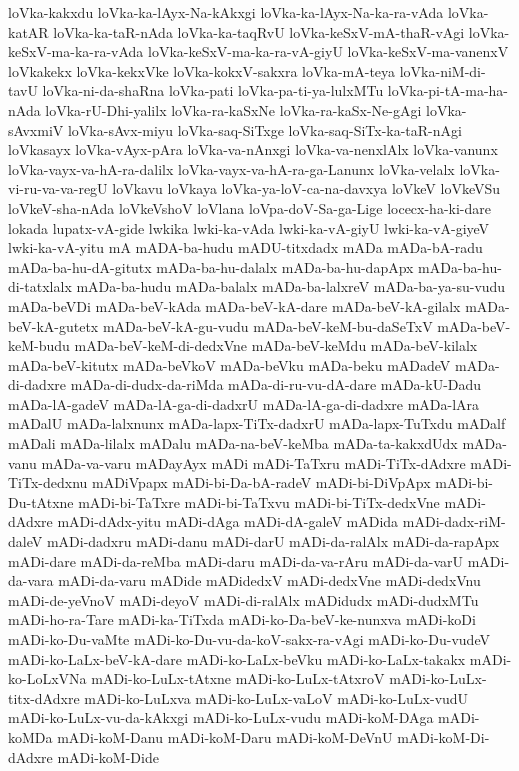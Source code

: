{loVka-kakxdu
loVka-ka-lAyx-Na-kAkxgi
loVka-ka-lAyx-Na-ka-ra-vAda
loVka-katAR
loVka-ka-taR-nAda
loVka-ka-taqRvU
loVka-keSxV-mA-thaR-vAgi
loVka-keSxV-ma-ka-ra-vAda
loVka-keSxV-ma-ka-ra-vA-giyU
loVka-keSxV-ma-vanenxV
loVkakekx
loVka-kekxVke
loVka-kokxV-sakxra
loVka-mA-teya
loVka-niM-di-tavU
loVka-ni-da-shaRna
loVka-pati
loVka-pa-ti-ya-lulxMTu
loVka-pi-tA-ma-ha-nAda
loVka-rU-Dhi-yalilx
loVka-ra-kaSxNe
loVka-ra-kaSx-Ne-gAgi
loVka-sAvxmiV
loVka-sAvx-miyu
loVka-saq-SiTxge
loVka-saq-SiTx-ka-taR-nAgi
loVkasayx
loVka-vAyx-pAra
loVka-va-nAnxgi
loVka-va-nenxlAlx
loVka-vanunx
loVka-vayx-va-hA-ra-dalilx
loVka-vayx-va-hA-ra-ga-Lanunx
loVka-velalx
loVka-vi-ru-va-va-regU
loVkavu
loVkaya
loVka-ya-loV-ca-na-davxya
loVkeV
loVkeVSu
loVkeV-sha-nAda
loVkeVshoV
loVlana
loVpa-doV-Sa-ga-Lige
locecx-ha-ki-dare
lokada
lupatx-vA-gide
lwkika
lwki-ka-vAda
lwki-ka-vA-giyU
lwki-ka-vA-giyeV
lwki-ka-vA-yitu
mA
mADA-ba-hudu
mADU-titxdadx
mADa
mADa-bA-radu
mADa-ba-hu-dA-gitutx
mADa-ba-hu-dalalx
mADa-ba-hu-dapApx
mADa-ba-hu-di-tatxlalx
mADa-ba-hudu
mADa-balalx
mADa-ba-lalxreV
mADa-ba-ya-su-vudu
mADa-beVDi
mADa-beV-kAda
mADa-beV-kA-dare
mADa-beV-kA-gilalx
mADa-beV-kA-gutetx
mADa-beV-kA-gu-vudu
mADa-beV-keM-bu-daSeTxV
mADa-beV-keM-budu
mADa-beV-keM-di-dedxVne
mADa-beV-keMdu
mADa-beV-kilalx
mADa-beV-kitutx
mADa-beVkoV
mADa-beVku
mADa-beku
mADadeV
mADa-di-dadxre
mADa-di-dudx-da-riMda
mADa-di-ru-vu-dA-dare
mADa-kU-Dadu
mADa-lA-gadeV
mADa-lA-ga-di-dadxrU
mADa-lA-ga-di-dadxre
mADa-lAra
mADalU
mADa-lalxnunx
mADa-lapx-TiTx-dadxrU
mADa-lapx-TuTxdu
mADalf
mADali
mADa-lilalx
mADalu
mADa-na-beV-keMba
mADa-ta-kakxdUdx
mADa-vanu
mADa-va-varu
mADayAyx
mADi
mADi-TaTxru
mADi-TiTx-dAdxre
mADi-TiTx-dedxnu
mADiVpapx
mADi-bi-Da-bA-radeV
mADi-bi-DiVpApx
mADi-bi-Du-tAtxne
mADi-bi-TaTxre
mADi-bi-TaTxvu
mADi-bi-TiTx-dedxVne
mADi-dAdxre
mADi-dAdx-yitu
mADi-dAga
mADi-dA-galeV
mADida
mADi-dadx-riM-daleV
mADi-dadxru
mADi-danu
mADi-darU
mADi-da-ralAlx
mADi-da-rapApx
mADi-dare
mADi-da-reMba
mADi-daru
mADi-da-va-rAru
mADi-da-varU
mADi-da-vara
mADi-da-varu
mADide
mADidedxV
mADi-dedxVne
mADi-dedxVnu
mADi-de-yeVnoV
mADi-deyoV
mADi-di-ralAlx
mADidudx
mADi-dudxMTu
mADi-ho-ra-Tare
mADi-ka-TiTxda
mADi-ko-Da-beV-ke-nunxva
mADi-koDi
mADi-ko-Du-vaMte
mADi-ko-Du-vu-da-koV-sakx-ra-vAgi
mADi-ko-Du-vudeV
mADi-ko-LaLx-beV-kA-dare
mADi-ko-LaLx-beVku
mADi-ko-LaLx-takakx
mADi-ko-LoLxVNa
mADi-ko-LuLx-tAtxne
mADi-ko-LuLx-tAtxroV
mADi-ko-LuLx-titx-dAdxre
mADi-ko-LuLxva
mADi-ko-LuLx-vaLoV
mADi-ko-LuLx-vudU
mADi-ko-LuLx-vu-da-kAkxgi
mADi-ko-LuLx-vudu
mADi-koM-DAga
mADi-koMDa
mADi-koM-Danu
mADi-koM-Daru
mADi-koM-DeVnU
mADi-koM-Di-dAdxre
mADi-koM-Dide
}
